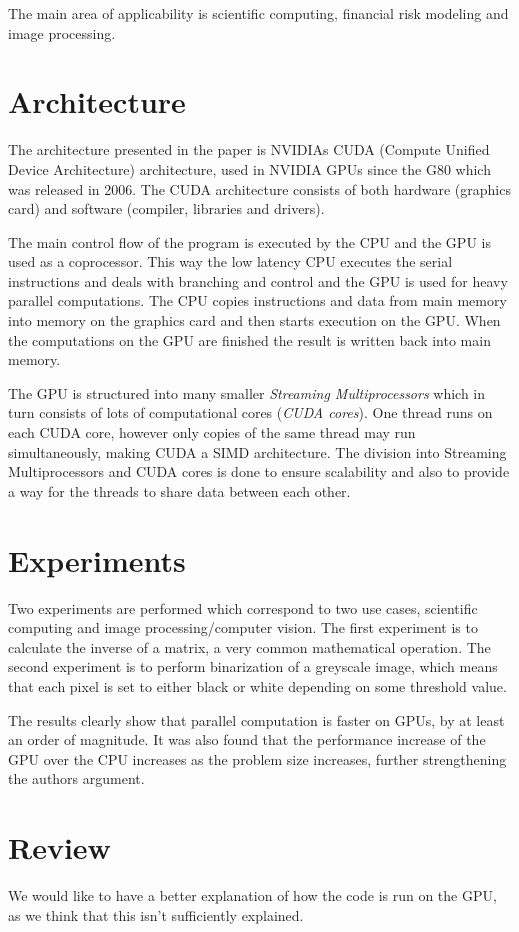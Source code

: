 \documentclass[titlepage, a4paper]{article}
\begin{document}
The main area of applicability is scientific computing, financial risk modeling and image processing.

\section{Architecture}\label{sec:arch}
The architecture presented in the paper is NVIDIAs CUDA (Compute Unified Device Architecture) architecture, used in NVIDIA GPUs since the G80 which was released in 2006. The CUDA architecture consists of both hardware (graphics card) and software (compiler, libraries and drivers).

The main control flow of the program is executed by the CPU and the GPU is used as a coprocessor. This way the low latency CPU executes the serial instructions and deals with branching and control and the GPU is used for heavy parallel computations. The CPU copies instructions and data from main memory into memory on the graphics card and then starts execution on the GPU. When the computations on the GPU are finished the result is written back into main memory.

The GPU is structured into many smaller \textit{Streaming Multiprocessors} which in turn consists of lots of computational cores (\textit{CUDA cores}). One thread runs on each CUDA core, however only copies of the same thread may run simultaneously, making CUDA a SIMD architecture. The division into Streaming Multiprocessors and CUDA cores is done to ensure scalability and also to provide a way for the threads to share data between each other.

\section{Experiments}\label{sec:results}
Two experiments are performed which correspond to two use cases, scientific computing and image processing/computer vision. The first experiment is to calculate the inverse of a matrix, a very common mathematical operation. The second experiment is to perform binarization of a greyscale image, which means that each pixel is set to either black or white depending on some threshold value.

The results clearly show that parallel computation is faster on GPUs, by at least an order of magnitude. It was also found that the performance increase of the GPU over the CPU increases as the problem size increases, further strengthening the authors argument. 

\section{Review}\label{sec:review}
We would like to have a better explanation of how the code is run on the GPU, as we think that this isn't sufficiently explained.
\end{document}
